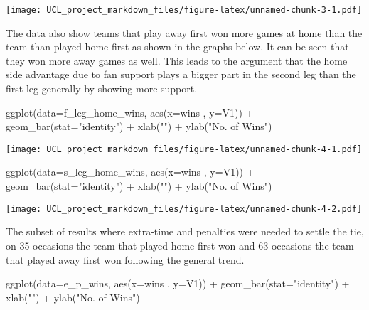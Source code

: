 \documentclass[
]{article}
\newenvironment{Shaded}{\begin{snugshade}}{\end{snugshade}}
\newcommand{\AttributeTok}[1]{\textcolor[rgb]{0.77,0.63,0.00}{#1}}
\newcommand{\FunctionTok}[1]{\textcolor[rgb]{0.00,0.00,0.00}{#1}}
\newcommand{\NormalTok}[1]{#1}
\newcommand{\SpecialCharTok}[1]{\textcolor[rgb]{0.00,0.00,0.00}{#1}}
\newcommand{\StringTok}[1]{\textcolor[rgb]{0.31,0.60,0.02}{#1}}
\begin{document}
\texttt{[image: UCL\_project\_markdown\_files/figure-latex/unnamed-chunk-3-1.pdf]}

The data also show teams that play away first won more games at home
than the team than played home first as shown in the graphs below. It
can be seen that they won more away games as well. This leads to the
argument that the home side advantage due to fan support plays a bigger
part in the second leg than the first leg generally by showing more
support.

\begin{Shaded}
\begin{Highlighting}[]
\FunctionTok{ggplot}\NormalTok{(}\AttributeTok{data=}\NormalTok{f\_leg\_home\_wins, }\FunctionTok{aes}\NormalTok{(}\AttributeTok{x=}\NormalTok{wins , }\AttributeTok{y=}\NormalTok{V1)) }\SpecialCharTok{+}
  \FunctionTok{geom\_bar}\NormalTok{(}\AttributeTok{stat=}\StringTok{"identity"}\NormalTok{) }\SpecialCharTok{+}
  \FunctionTok{xlab}\NormalTok{(}\StringTok{""}\NormalTok{) }\SpecialCharTok{+} \FunctionTok{ylab}\NormalTok{(}\StringTok{"No. of Wins"}\NormalTok{)}
\end{Highlighting}
\end{Shaded}

\texttt{[image: UCL\_project\_markdown\_files/figure-latex/unnamed-chunk-4-1.pdf]}

\begin{Shaded}
\begin{Highlighting}[]
\FunctionTok{ggplot}\NormalTok{(}\AttributeTok{data=}\NormalTok{s\_leg\_home\_wins, }\FunctionTok{aes}\NormalTok{(}\AttributeTok{x=}\NormalTok{wins , }\AttributeTok{y=}\NormalTok{V1)) }\SpecialCharTok{+}
  \FunctionTok{geom\_bar}\NormalTok{(}\AttributeTok{stat=}\StringTok{"identity"}\NormalTok{) }\SpecialCharTok{+}
  \FunctionTok{xlab}\NormalTok{(}\StringTok{""}\NormalTok{) }\SpecialCharTok{+} \FunctionTok{ylab}\NormalTok{(}\StringTok{"No. of Wins"}\NormalTok{)}
\end{Highlighting}
\end{Shaded}

\texttt{[image: UCL\_project\_markdown\_files/figure-latex/unnamed-chunk-4-2.pdf]}

The subset of results where extra-time and penalties were needed to
settle the tie, on 35 occasions the team that played home first won and
63 occasions the team that played away first won following the general
trend.

\begin{Shaded}
\begin{Highlighting}[]
\FunctionTok{ggplot}\NormalTok{(}\AttributeTok{data=}\NormalTok{e\_p\_wins, }\FunctionTok{aes}\NormalTok{(}\AttributeTok{x=}\NormalTok{wins , }\AttributeTok{y=}\NormalTok{V1)) }\SpecialCharTok{+}
  \FunctionTok{geom\_bar}\NormalTok{(}\AttributeTok{stat=}\StringTok{"identity"}\NormalTok{) }\SpecialCharTok{+}
  \FunctionTok{xlab}\NormalTok{(}\StringTok{""}\NormalTok{) }\SpecialCharTok{+} \FunctionTok{ylab}\NormalTok{(}\StringTok{"No. of Wins"}\NormalTok{)}
\end{Highlighting}
\end{Shaded}
\end{document}
